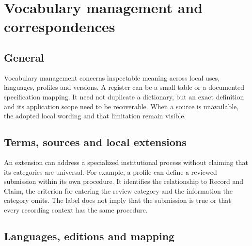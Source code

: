 \documentclass[11pt,a4paper]{article}
\begin{document}
\section{Vocabulary management and correspondences}
\subsection{General}
Vocabulary management concerns inspectable meaning across local uses, languages, profiles and versions. A register can be a small table or a documented specification mapping. It need not duplicate a dictionary, but an exact definition and its application scope need to be recoverable. When a source is unavailable, the adopted local wording and that limitation remain visible.

\subsection{Terms, sources and local extensions}


An extension can address a specialized institutional process without claiming that its categories are universal. For example, a profile can define a reviewed submission within its own procedure. It identifies the relationship to Record and Claim, the criterion for entering the review category and the information the category omits. The label does not imply that the submission is true or that every recording context has the same procedure.

\subsection{Languages, editions and mapping}
\end{document}
